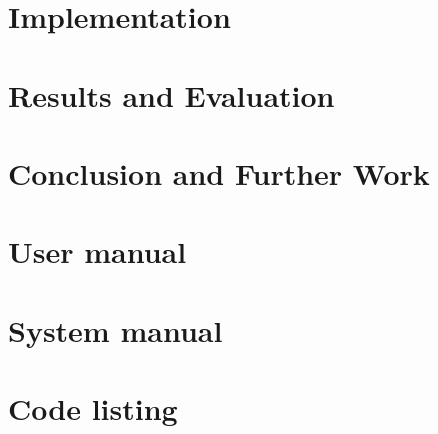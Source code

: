 \documentclass[12pt,oneside]{ucl_thesis}
\begin{document}
\chapter{Implementation}
\label{chp:impl}



\chapter{Results and Evaluation}
\label{chp:test&results}



\chapter{Conclusion and Further Work}
\label{chp:conc}





\cleardoublepage
\appendix

\chapter{User manual}


\chapter{System manual}


\chapter{Code listing}



%

%




\end{document}
